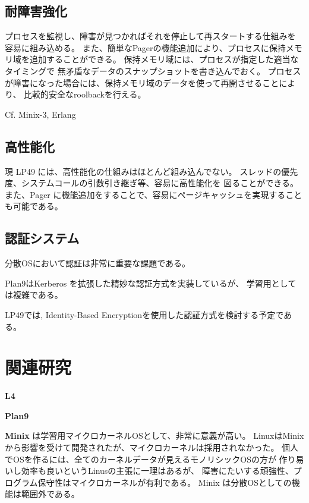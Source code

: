 \documentclass{jarticle}
\begin{document}
\subsection{耐障害強化}

プロセスを監視し、障害が見つかればそれを停止して再スタートする仕組みを
容易に組み込める。
また、簡単なPagerの機能追加により、プロセスに保持メモリ域を追加することができる。
保持メモリ域には、プロセスが指定した適当なタイミングで
無矛盾なデータのスナップショットを書き込んでおく。
プロセスが障害になった場合には、保持メモリ域のデータを使って再開させることにより、
比較的安全なroolbackを行える。

Cf. Minix-3, Erlang



\subsection{高性能化}
 
現 LP49 には、高性能化の仕組みはほとんど組み込んでない。
スレッドの優先度、システムコールの引数引き継ぎ等、容易に高性能化を
図ることができる。
また、Pager に機能追加をすることで、容易にページキャッシュを実現することも可能である。



\subsection{認証システム}

分散OSにおいて認証は非常に重要な課題である。

Plan9はKerberos を拡張した精妙な認証方式を実装しているが、
学習用としては複雑である。

LP49では,
Identity-Based Encryptionを使用した認証方式を検討する予定である。




\section{関連研究}

{\bf L4}


{\bf Plan9} 

{\bf Minix} は学習用マイクロカーネルOSとして、非常に意義が高い。
LinuxはMinixから影響を受けて開発されたが、マイクロカーネルは採用されなかった。
個人でOSを作るには、全てのカーネルデータが見えるモノリシックOSの方が
作り易いし効率も良いというLinusの主張に一理はあるが、
障害にたいする頑強性、プログラム保守性はマイクロカーネルが有利である。
Minix は分散OSとしての機能は範囲外である。
\end{document}
